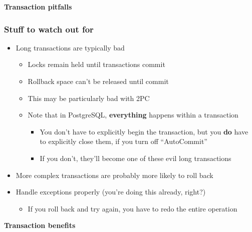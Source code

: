 \documentclass[svgnames]{beamer}
\begin{document}
\begin{frame}
    \begin{centering}
\textbf{Transaction pitfalls}
    \par
    \end{centering}
\end{frame}

\begin{frame}
    \frametitle{Stuff to watch out for}
    \begin{itemize}
        \item Long transactions are typically bad
        \begin{itemize}
            \item Locks remain held until transactions commit
            \item Rollback space can't be released until commit
            \item This may be particularly bad with 2PC
            \item Note that in PostgreSQL, \textbf{everything} happens within a transaction
            \begin{itemize}
                \item You don't have to explicitly begin the transaction, but
                you \textbf{do} have to explicitly close them, if you turn off
                ``AutoCommit''
                \item If you don't, they'll become one of these evil long transactions
            \end{itemize}
        \end{itemize}
        \item More complex transactions are probably more likely to roll back
        \item Handle exceptions properly (you're doing this already, right?)
        \begin{itemize}
            \item If you roll back and try again, you have to redo the entire operation
        \end{itemize}
    \end{itemize}
\end{frame}

\begin{frame}
    \begin{centering}
\textbf{Transaction benefits}
    \par
    \end{centering}
\end{frame}
\end{document}
